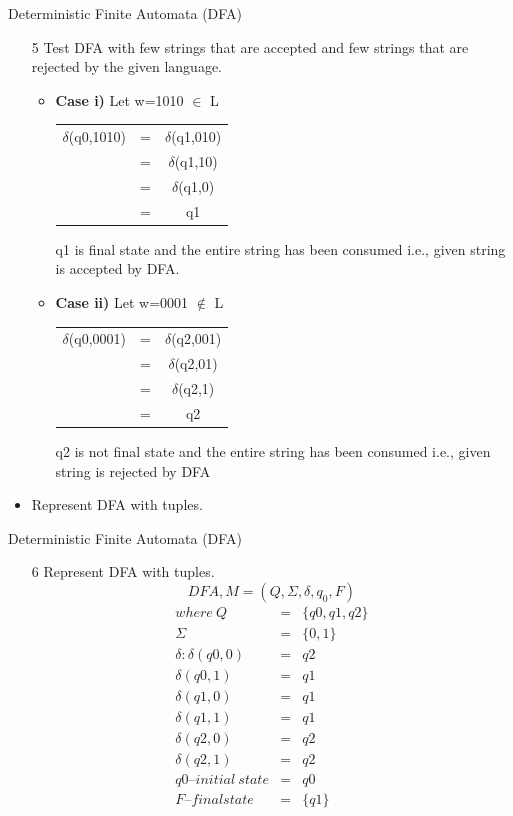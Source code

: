 \documentclass{beamer}
\begin{document}
\begin{frame}{Deterministic Finite Automata (DFA)}
	
	\begin{itemize}
		\item[5] Test DFA with few strings that are accepted and few strings that are 
		rejected by the given language.
		\begin{itemize}
			\item \textbf{Case i)} Let w=1010 $\in$ L
		\begin{center}
				\begin{tabular}{c c c}
				$\delta$(q0,1010) & = & $\delta$(q1,010) \\
				& = & $\delta$(q1,10) \\
				&=& $\delta$(q1,0) \\
				& = & q1
			\end{tabular}
		\end{center}
		
			q1 is final state and the entire string has been consumed i.e., given string 
			is accepted by DFA.
			
			\item \textbf{Case ii)} Let w=0001 $\notin$ L
				\begin{center}
				\begin{tabular}{c c c}
		$\delta$(q0,0001) &=&$\delta$(q2,001)\\ 
			&=& $\delta$(q2,01)\\
			&=& $\delta$(q2,1)\\
			&=& q2\\
				\end{tabular}
		\end{center}
			q2 is not final state and the entire string has been consumed i.e., given 
			string is rejected by DFA
		\end{itemize}
		
		\item Represent DFA with tuples.
		
	\end{itemize}
\end{frame}
\begin{frame}{Deterministic Finite Automata (DFA)}
	
	\begin{itemize}	
		\item[6] Represent DFA with tuples.
		$$	DFA, M = (Q,\Sigma,\delta,q_0,F)$$
		\begin{eqnarray*}
		where\  Q &=& \{q0, q1, q2\} \\
		\Sigma &=& \{ 0,1 \} \\
		\delta: \delta(q0,0)&=&q2 \\
		\delta(q0,1)&=&q1 \\
		\delta(q1,0)&=&q1 \\
	\delta(q1,1)&=&q1
 \\
	\delta(q2,0)&=&q2 \\
	\delta(q2,1)&=&q2 \\
		q0 – initial\  state& = & q0\\
			F – final state & =& \{ q1\}
		\end{eqnarray*}
	\end{itemize}
\end{frame}
\end{document}
